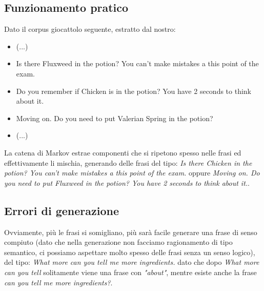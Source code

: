 \subsection{Funzionamento pratico}
Dato il corpus giocattolo seguente, estratto dal nostro:
\begin{itemize}
    \item (...)
    \item Is there Fluxweed in the potion? You can't make mistakes a this point of the exam.
    \item Do you remember if Chicken is in the potion? You have 2 seconds to think about it.
    \item Moving on. Do you need to put Valerian Spring in the potion?
    \item (...)
\end{itemize}
La catena di Markov estrae componenti che si ripetono spesso nelle frasi ed effettivamente li mischia, generando delle frasi del tipo: \textit{Is there Chicken in the potion? You can't make mistakes a this point of the exam.} oppure \textit{Moving on. Do you need to put Fluxweed in the potion? You have 2 seconds to think about it.}.

\subsection{Errori di generazione}
Ovviamente, più le frasi si somigliano, più sarà facile generare una frase di senso compiuto (dato che nella generazione non facciamo ragionamento di tipo semantico, ci possiamo aspettare molto spesso delle frasi senza un senso logico), del tipo: \textit{What more can you tell me more ingredients.} dato che dopo \textit{What more can you tell} solitamente viene una frase con \textit{"about"}, mentre esiste anche la frase \textit{can you tell me more ingredients?}.